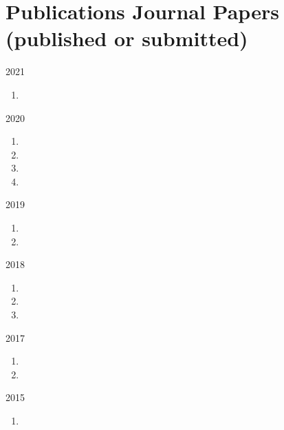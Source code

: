 \section*{Publications {\small Journal Papers (published or submitted)}}

\begin{paracol}{2}
  2021
\switchcolumn
  \begin{enumerate}
    \item {}
    \setcounter{pubcounter}{\theenumi}
  \end{enumerate}
\end{paracol}

\begin{paracol}{2}
  2020
\switchcolumn
  \begin{enumerate}
    \setcounter{enumi}{\thepubcounter}
    \item {}
    \item {}
    \item {}
    \item {}
    \setcounter{pubcounter}{\theenumi}
  \end{enumerate}
\end{paracol}

\begin{paracol}{2}
  2019
\switchcolumn
  \begin{enumerate}
    \setcounter{enumi}{\thepubcounter}
    \item {}
    \item {}
    \setcounter{pubcounter}{\theenumi}
  \end{enumerate}
\end{paracol}

\begin{paracol}{2}
  2018
\switchcolumn
  \begin{enumerate}
    \setcounter{enumi}{\thepubcounter}
    \item {}
    \item {}
    \item {}
    \setcounter{pubcounter}{\theenumi}
  \end{enumerate}
\end{paracol}

\begin{paracol}{2}
  2017
\switchcolumn
  \begin{enumerate}
    \setcounter{enumi}{\thepubcounter}
    \item {}
    \item {}
    \setcounter{pubcounter}{\theenumi}
  \end{enumerate}
\end{paracol}

\begin{paracol}{2}
  2015
\switchcolumn
  \begin{enumerate}
    \setcounter{enumi}{\thepubcounter}
    \item {}
    \setcounter{pubcounter}{\theenumi}
  \end{enumerate}
\end{paracol}